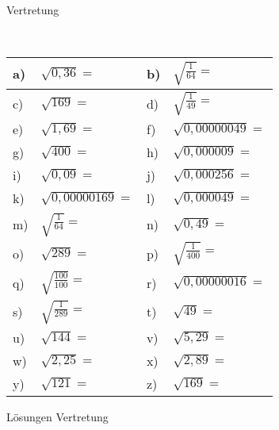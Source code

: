 \documentclass[12pt]{article}
\begin{document}
\centerline{{\Large Vertretung}} 
\vspace{1cm}
\noindent \\


\begin{tabularx}{\textwidth}{|C{1.0cm}|X|C{1.0cm}|X|}
\hline
a)&$\sqrt{0,36}=$
&
b)&$\sqrt{\frac{1}{64}}=$
\\\hline
c)&$\sqrt{169}=$
&
d)&$\sqrt{\frac{1}{49}}=$
\\\hline
e)&$\sqrt{1,69}=$
&
f)&$\sqrt{0,00000049}=$
\\\hline
g)&$\sqrt{400}=$
&
h)&$\sqrt{0,000009}=$
\\\hline
i)&$\sqrt{0,09}=$
&
j)&$\sqrt{0,000256}=$
\\\hline
k)&$\sqrt{0,00000169}=$
&
l)&$\sqrt{0,000049}=$
\\\hline
m)&$\sqrt{\frac{1}{64}}=$
&
n)&$\sqrt{0,49}=$
\\\hline
o)&$\sqrt{289}=$
&
p)&$\sqrt{\frac{1}{400}}=$
\\\hline
q)&$\sqrt{\frac{100}{100}}=$
&
r)&$\sqrt{0,00000016}=$
\\\hline
s)&$\sqrt{\frac{1}{289}}=$
&
t)&$\sqrt{49}=$
\\\hline
u)&$\sqrt{144}=$
&
v)&$\sqrt{5,29}=$
\\\hline
w)&$\sqrt{2,25}=$
&
x)&$\sqrt{2,89}=$
\\\hline
y)&$\sqrt{121}=$
&
z)&$\sqrt{169}=$
\\\hline
\end{tabularx}
\vspace{0.5cm}
\newpage
{}
\centerline{{\large Lösungen Vertretung}} 
\vspace{0.5cm}
\end{document}
